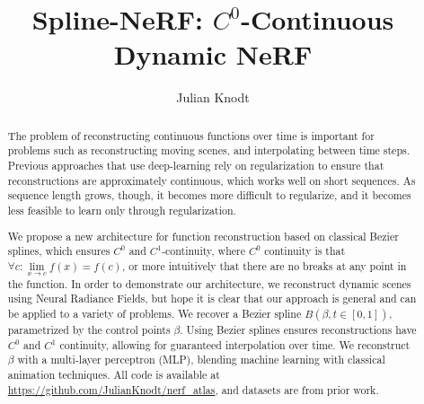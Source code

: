\documentclass[runningheads]{llncs}
\begin{document}
\pagestyle{headings}
\mainmatter
\def\ECCVSubNumber{6195}

\title{Spline-NeRF: $C^0$-Continuous Dynamic NeRF}
\author{Julian Knodt}

\maketitle

\begin{abstract}
The problem of reconstructing continuous functions over time is important for problems such as reconstructing moving scenes, and interpolating between time steps.
Previous approaches that use deep-learning rely on regularization to ensure that reconstructions are approximately continuous, which works well on short sequences. As sequence length grows, though, it becomes more difficult to regularize, and it becomes less feasible to learn only through regularization.

We propose a new architecture for function reconstruction based on classical Bezier splines, which ensures $C^0$ and $C^1$-continuity, where $C^0$ continuity is that $\forall c:\lim\limits_{x\to c} f(x) = f(c)$, or more intuitively that there are no breaks at any point in the function. In order to demonstrate our architecture, we reconstruct dynamic scenes using Neural Radiance Fields, but hope it is clear that our approach is general and can be applied to a variety of problems. We recover a Bezier spline $B(\beta, t\in[0,1])$,
parametrized by the control points $\beta$. Using Bezier splines ensures reconstructions have $C^0$ and $C^1$ continuity, allowing for guaranteed interpolation over time. We reconstruct $\beta$ with a multi-layer perceptron (MLP), blending machine learning with classical animation techniques. All code is available at
\url{https://github.com/JulianKnodt/nerf_atlas}, and datasets are from prior work.

\end{abstract}
\end{document}
